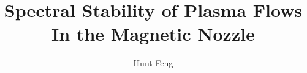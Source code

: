 \documentclass{uofsthesis-cs}
\title{Spectral Stability of Plasma Flows In the Magnetic Nozzle}
\author{Hunt Feng}
\theoremstyle{plain}
\theoremstyle{definition}
\begin{document}
\maketitle

\frontmatter









%
% 
% 
%












\nocite{*}




%

\uofsappendix

\begin{appendices}
	
\end{appendices}
\end{document}

